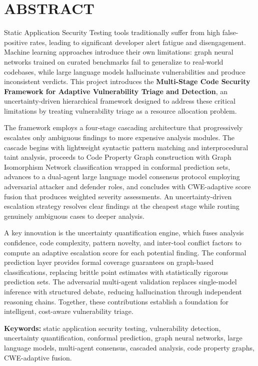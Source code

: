 \documentclass[a4paper, 12pt]{extreport}
\begin{document}
\thispagestyle{empty}
\chapter*{\LARGE ABSTRACT}
Static Application Security Testing tools traditionally suffer from high false-positive rates, leading to significant developer alert fatigue and disengagement. Machine learning approaches introduce their own limitations: graph neural networks trained on curated benchmarks fail to generalize to real-world codebases, while large language models hallucinate vulnerabilities and produce inconsistent verdicts. This project introduces the \textbf{Multi-Stage Code Security Framework for Adaptive Vulnerability Triage and Detection}, an uncertainty-driven hierarchical framework designed to address these critical limitations by treating vulnerability triage as a resource allocation problem.

\indent The framework employs a four-stage cascading architecture that progressively escalates only ambiguous findings to more expensive analysis modules. The cascade begins with lightweight syntactic pattern matching and interprocedural taint analysis, proceeds to Code Property Graph construction with Graph Isomorphism Network classification wrapped in conformal prediction sets, advances to a dual-agent large language model consensus protocol employing adversarial attacker and defender roles, and concludes with CWE-adaptive score fusion that produces weighted severity assessments. An uncertainty-driven escalation strategy resolves clear findings at the cheapest stage while routing genuinely ambiguous cases to deeper analysis.

\indent A key innovation is the uncertainty quantification engine, which fuses analysis confidence, code complexity, pattern novelty, and inter-tool conflict factors to compute an adaptive escalation score for each potential finding. The conformal prediction layer provides formal coverage guarantees on graph-based classifications, replacing brittle point estimates with statistically rigorous prediction sets. The adversarial multi-agent validation replaces single-model inference with structured debate, reducing hallucination through independent reasoning chains. Together, these contributions establish a foundation for intelligent, cost-aware vulnerability triage.

\vspace{0.5em}
\noindent\textbf{Keywords:} static application security testing, vulnerability detection, uncertainty quantification, conformal prediction, graph neural networks, large language models, multi-agent consensus, cascaded analysis, code property graphs, CWE-adaptive fusion.
\end{document}
